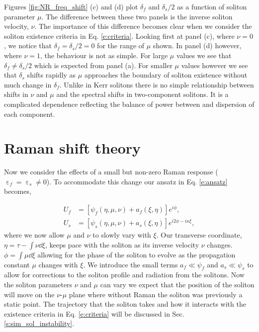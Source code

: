 \documentclass[reprint,
 amsmath,amssymb,
 pra,
]{revtex4-1}
\newcommand{\eq}[1]{
\begin{equation}\begin{aligned}
#1
\end{aligned}\end{equation}}
\DeclareMathOperator{\eps}{\varepsilon}
\begin{document}
Figures \ref{fig:NR_freq_shift} (c) and (d) plot $\delta_f$ and $\delta_s/2$ as a function of soliton parameter $\mu$. The difference between these two panels is the inverse soliton velocity, $\nu$. The importance of this difference becomes clear when we consider the soliton existence criteria in Eq. \eqref{e:criteria}. Looking first at panel (c), where $\nu=0$, we notice that $\delta_f = \delta_s/2 =0$ for the range of $\mu$ shown. In panel (d) however, where $\nu=1$, the behaviour is not as simple. For large $\mu$ values we see that $\delta_f \neq \delta_s/2$ which is expected from panel (a). For smaller $\mu$ values however we see that $\delta_s$ shifts rapidly as $\mu$ approaches the boundary of soliton existence without much change in $\delta_f$. Unlike in Kerr solitons there is no simple relationship between shifts in $\nu$ and $\mu$ and the spectral shifts in two-component solitons. It is a complicated dependence reflecting the balance of power between and dispersion of each component.


\section{Raman shift theory}
Now we consider the effects of a small but non-zero Raman response ($\eps_f=\eps_s \neq 0$). To accommodate this change our ansatz in Eq. \eqref{e:ansatz} becomes,
\eq{
U_f &= [\psi_f(\eta,\mu,\nu) + a_f(\xi, \eta) ]e^{i\phi},\\
U_s &= [\psi_s(\eta,\mu,\nu)+ a_s(\xi, \eta) ]e^{i2\phi-i\kappa\xi },
}
where we now allow $\mu$ and $\nu$ to slowly vary with $\xi$. Our transverse coordinate, $\eta = \tau - \int \nu \dd \xi$, keeps pace with the soliton as its inverse velocity $\nu$ changes. $\phi = \int \mu \dd \xi$ allowing for the phase of the soliton to evolve as the propagation constant $\mu$ changes with $\xi$. We introduce the small terms $a_f \ll \psi_f$ and $a_s \ll \psi_s$ to allow for corrections to the soliton profile and radiation from the solitons. Now the soliton parameters $\nu$ and $\mu$ can vary we expect that the position of the soliton will move on the $\nu$-$\mu$ plane where without Raman the soliton was previously a static point. The trajectory that the soliton takes and how it interacts with the existence criteria in Eq. \eqref{e:criteria} will be discussed in Sec. \ref{s:sim_sol_instability}.
\end{document}
